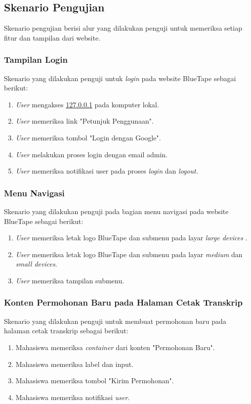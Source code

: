 \subsection{Skenario Pengujian}
Skenario pengujian berisi alur yang dilakukan penguji untuk memeriksa setiap fitur dan tampilan dari website. 
\subsubsection{Tampilan Login}
Skenario yang dilakukan penguji untuk \textit{login} pada website BlueTape sebagai berikut:
\begin{enumerate}
	\item \textit{User} mengakses \url{127.0.0.1} pada komputer lokal.
	\item \textit{User} memeriksa link "Petunjuk Penggunaan".
	\item \textit{User} memeriksa tombol "Login dengan Google".
	\item \textit{User} melakukan proses login dengan email admin.
	\item \textit{User} memeriksa notifikasi user pada proses \textit{login} dan \textit{logout}.	
\end{enumerate}

\subsubsection{Menu Navigasi}
Skenario yang dilakukan penguji pada bagian menu navigasi pada website BlueTape sebagai berikut:
\begin{enumerate}
	\item \textit{User} memeriksa letak logo BlueTape dan submenu pada layar \textit{large devices} .
	\item \textit{User} memeriksa letak logo BlueTape dan submenu pada layar \textit{medium} dan \textit{small devices}.	
	\item \textit{User} memeriksa tampilan submenu.
\end{enumerate}

\subsubsection{Konten Permohonan Baru pada Halaman Cetak Transkrip}
Skenario yang dilakukan penguji untuk membuat permohonan baru pada halaman cetak transkrip sebagai berikut:
\begin{enumerate}
	\item Mahasiswa memeriksa \textit{container} dari konten "Permohonan Baru".
	\item Mahasiswa memeriksa label dan input.
	\item Mahasiswa memeriksa tombol "Kirim Permohonan".	
	\item Mahasiswa memeriksa notifikasi \textit{user}.
\end{enumerate}

